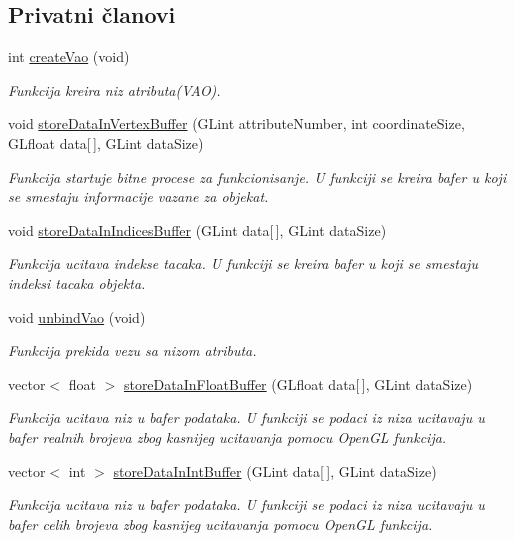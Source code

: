 \subsection*{Privatni članovi}
\begin{DoxyCompactItemize}
\item 
int \hyperlink{classcore_1_1VaoLoader_af76598a15d38378e594778d9a63a7a6a}{create\+Vao} (void)
\begin{DoxyCompactList}\small\item\em Funkcija kreira niz atributa(\+V\+A\+O). \end{DoxyCompactList}\item 
void \hyperlink{classcore_1_1VaoLoader_a234b87947a46ffcaea7dc6de09185a41}{store\+Data\+In\+Vertex\+Buffer} (G\+Lint attribute\+Number, int coordinate\+Size, G\+Lfloat data\mbox{[}$\,$\mbox{]}, G\+Lint data\+Size)
\begin{DoxyCompactList}\small\item\em Funkcija startuje bitne procese za funkcionisanje. U funkciji se kreira bafer u koji se smestaju informacije vazane za objekat. \end{DoxyCompactList}\item 
void \hyperlink{classcore_1_1VaoLoader_a7195d251490976b2053548e19b7c6f1d}{store\+Data\+In\+Indices\+Buffer} (G\+Lint data\mbox{[}$\,$\mbox{]}, G\+Lint data\+Size)
\begin{DoxyCompactList}\small\item\em Funkcija ucitava indekse tacaka. U funkciji se kreira bafer u koji se smestaju indeksi tacaka objekta. \end{DoxyCompactList}\item 
void \hyperlink{classcore_1_1VaoLoader_a8876e8e71b0299c47406afc7a2cb6d81}{unbind\+Vao} (void)
\begin{DoxyCompactList}\small\item\em Funkcija prekida vezu sa nizom atributa. \end{DoxyCompactList}\item 
vector$<$ float $>$ \hyperlink{classcore_1_1VaoLoader_a016f118749e83bbf79e6d0f2c9bf9209}{store\+Data\+In\+Float\+Buffer} (G\+Lfloat data\mbox{[}$\,$\mbox{]}, G\+Lint data\+Size)
\begin{DoxyCompactList}\small\item\em Funkcija ucitava niz u bafer podataka. U funkciji se podaci iz niza ucitavaju u bafer realnih brojeva zbog kasnijeg ucitavanja pomocu Open\+GL funkcija. \end{DoxyCompactList}\item 
vector$<$ int $>$ \hyperlink{classcore_1_1VaoLoader_ab2c24b482be973465c548b03bf5df3af}{store\+Data\+In\+Int\+Buffer} (G\+Lint data\mbox{[}$\,$\mbox{]}, G\+Lint data\+Size)
\begin{DoxyCompactList}\small\item\em Funkcija ucitava niz u bafer podataka. U funkciji se podaci iz niza ucitavaju u bafer celih brojeva zbog kasnijeg ucitavanja pomocu Open\+GL funkcija. \end{DoxyCompactList}\end{DoxyCompactItemize}
